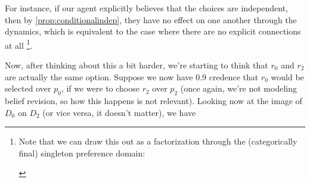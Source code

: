 \documentclass{article}
\begin{document}
	\begin{center}
	\end{center}
	For instance, if our agent explicitly believes that the choices are independent, then by \cref{prop:conditionalindep}, they have no effect on one another through the dynamics, which is equivalent to the case where there are no explicit connections at all%
	\footnote{Note that we can draw this out as a factorization through the (categorically final) singleton preference domain:\\
 	\begin{center}
	\end{center} }.
	 
	Now, after thinking about this a bit harder, we're starting to think that $r_0$ and $r_2$ are actually the same option. Suppose we now have 0.9 credence that $r_0$ would be selected over $p_0$, if we were to choose $r_2$ over $p_2$ (once again, we're not modeling belief revision, so how this happens is not relevant). Looking now at the image of $D_0$ on $D_2$ (or vice versa, it doesn't matter), we have 
	
\end{document}
